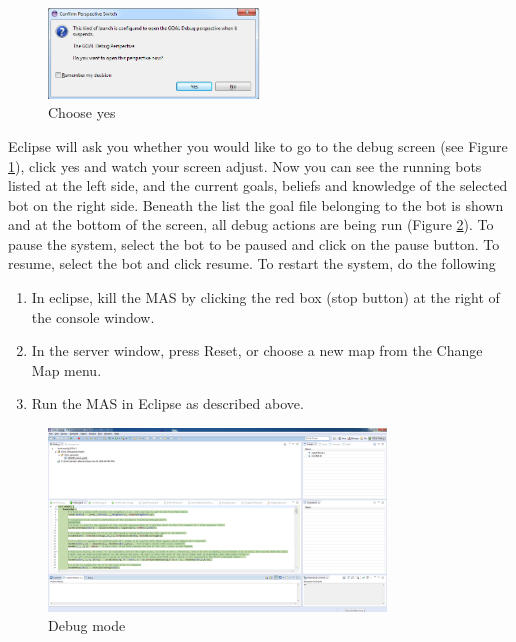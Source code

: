 \documentclass[11pt,a4paper]{article}
\begin{document}
\begin{figure}
  \begin{center}
    \includegraphics[width=0.5\textwidth]{debug.png}
  \end{center}
  \caption{Choose yes}\label{fig:EclipseDebug}
\end{figure}
Eclipse will ask you whether you would like to go to the debug screen (see Figure \ref{fig:EclipseDebug}), click yes and watch your screen adjust.
Now you can see the running bots listed at the left side, and the current goals, beliefs and knowledge of the selected bot on the right side. Beneath the list the goal file belonging to the bot is shown and at the bottom of the screen, all debug actions are being run (Figure \ref{fig:Eclipse}).
To pause the system, select the bot to be paused and click on the pause button. To resume, select the bot and click resume.
To restart the system, do the following
\begin{enumerate}
\item In eclipse, kill the MAS by clicking the red box (stop button) at the right of the console window.
\item In the server window, press Reset, or choose a new map from the Change Map menu.
\item Run the MAS in Eclipse as described above.
\end{enumerate}

\begin{figure}
  \begin{center}
    \includegraphics[width=0.8\textwidth]{debugmode.png}
    \caption{Debug mode}\label{fig:Eclipse}
  \end{center}
\end{figure}
\end{document}
